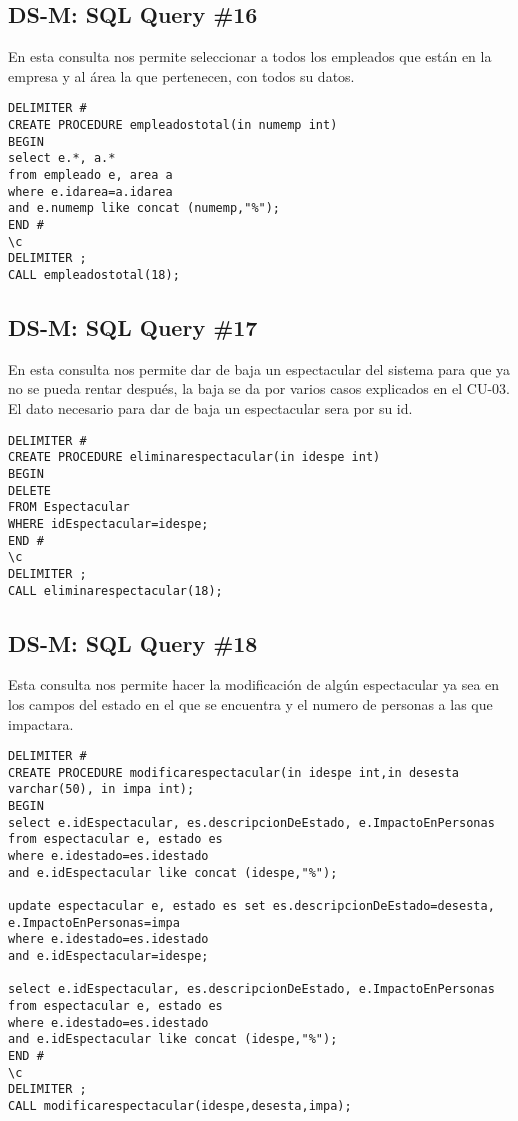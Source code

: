 \subsection{DS-M: SQL Query \#16}
En esta consulta nos permite seleccionar a todos los empleados que están en la empresa y al área  la que pertenecen, con todos su datos.
\begin{verbatim}
DELIMITER #
CREATE PROCEDURE empleadostotal(in numemp int)
BEGIN
select e.*, a.*
from empleado e, area a
where e.idarea=a.idarea
and e.numemp like concat (numemp,"%");
END #
\c 
DELIMITER ;
CALL empleadostotal(18);
\end{verbatim}


\subsection{DS-M: SQL Query \#17}
En esta consulta nos permite dar de baja un espectacular del sistema para que ya no se pueda rentar después, la baja se da por varios casos explicados en el CU-03.
El dato necesario para dar de baja un espectacular sera por su id.
\begin{verbatim}
DELIMITER #
CREATE PROCEDURE eliminarespectacular(in idespe int)
BEGIN
DELETE 
FROM Espectacular 
WHERE idEspectacular=idespe;
END #
\c 
DELIMITER ;
CALL eliminarespectacular(18);
\end{verbatim}
\clearpage
\subsection{DS-M: SQL Query \#18}
Esta consulta nos permite hacer la modificación de algún espectacular ya sea en los campos del estado en el que se encuentra y el numero de personas a las que impactara.
\begin{verbatim}
DELIMITER #
CREATE PROCEDURE modificarespectacular(in idespe int,in desesta varchar(50), in impa int);
BEGIN
select e.idEspectacular, es.descripcionDeEstado, e.ImpactoEnPersonas 
from espectacular e, estado es
where e.idestado=es.idestado
and e.idEspectacular like concat (idespe,"%");
 
update espectacular e, estado es set es.descripcionDeEstado=desesta, e.ImpactoEnPersonas=impa
where e.idestado=es.idestado
and e.idEspectacular=idespe;

select e.idEspectacular, es.descripcionDeEstado, e.ImpactoEnPersonas 
from espectacular e, estado es
where e.idestado=es.idestado
and e.idEspectacular like concat (idespe,"%");
END #
\c 
DELIMITER ;
CALL modificarespectacular(idespe,desesta,impa);
\end{verbatim}

